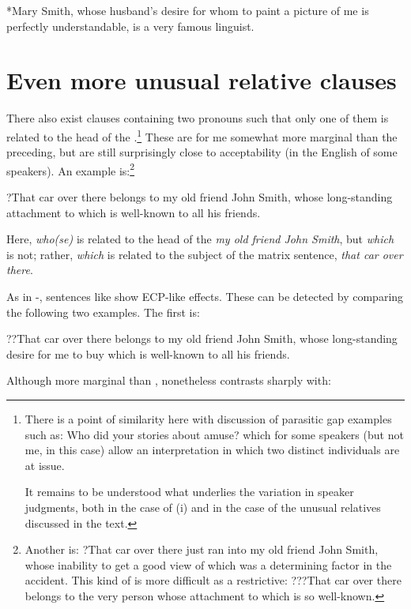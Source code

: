 \documentclass[output=paper]{LSP/langsci}
\begin{document}
\ea\label{ex:kayne:9}
   *Mary Smith, whose husband’s desire for whom to paint a picture of me is perfectly understandable, is a very famous linguist.
\z
\largerpage[-3]
\pagebreak\section{Even more unusual relative clauses}
     There also exist  clauses containing two  pronouns such that only one of them is related to the head of the .\footnote{\relax There is a point of similarity here with  discussion of parasitic gap examples such as:
   \ea Who did your stories about amuse?\z
which for some speakers (but not me, in this case) allow an interpretation in which two distinct individuals are at issue.

     It remains to be understood what underlies the variation in speaker judgments, both in the case of (i) and in the case of the unusual relatives discussed in the text.} 
  These are for me somewhat more marginal than the preceding, but are still surprisingly close to acceptability (in the English of some speakers).  An example is:\footnote{Another is:
   \ea  ?That car over there just ran into my old friend John Smith, whose inability to get a good view of which was a determining factor in the accident.\z
     This kind of  is more difficult as a restrictive:
   \ea  ???That car over there belongs to the very {person} whose attachment to which is so well-known.\z}

\ea\label{ex:kayne:10}
  ?That car over there belongs to my old friend John Smith, whose long-standing attachment to which is well-known to all his friends.
\z

Here, \textit{who(se)} is related to the head of the  \textit{my old friend John Smith}, but \textit{which} is not; rather, \textit{which} is related to the subject of the matrix sentence, \textit{that car over there}.

     As in -, sentences like  show ECP-like effects.  These can be detected by comparing the following two examples. The first is:

\ea\label{ex:kayne:11}
   ??That car over there belongs to my old friend John Smith, whose long-standing desire for me to buy which is well-known to all his friends.
\z

Although more marginal than ,  nonetheless contrasts sharply with:
\end{document}
